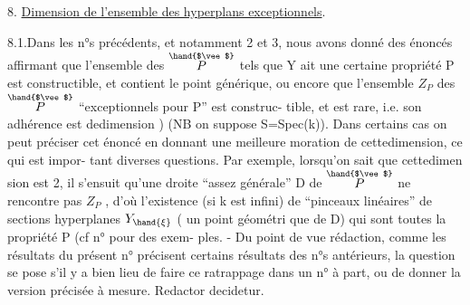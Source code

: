 
8. \uline{Dimension de l'ensemble des hyperplans exceptionnels}.

8.1.Dans les n°s précédents, et notamment 2 et 3, nous avons donné des
énoncés affirmant que l'ensemble des \hand{$\xi\in$} $\overset{\hand{$\vee$}}{P}$ tels que Y ait une certaine
propriété P est constructible, et contient le point générique\inserted{$\eta$},  ou
encore que l'ensemble $Z_P$ des \hand{$\xi\in$} $\overset{\hand{$\vee$}}{P}$ ``exceptionnels pour P'' est construc-%
tible, et est rare, i.e. son adhérence est dedimension \hand{$\geq$} ) 
(NB on suppose S=Spec(k)). Dans certains cas on peut préciser cet énoncé
en donnant une meilleure moration de cettedimension, ce qui est impor-%
tant  diverses questions. Par exemple, lorsqu'on sait que cettedimen
sion est \hand{$\geq$} 2, il s'ensuit qu'une droite ``assez générale'' D de $\overset{\hand{$\vee$}}{P}$
ne rencontre pas $Z_P$ , d'où l'existence (si k est infini) de ``pinceaux
linéaires'' de sections hyperplanes  $Y_{\hand{\xi}}$ (\hand{$\xi$} un point géométri
que de D) qui sont toutes la propriété P (cf n° \inserted{$-\ -\ -\ -$} pour des exem-%
ples. - Du point de vue rédaction, comme les résultats du présent n°
précisent certains résultats des n°s antérieurs, la question se pose s'il
y a bien lieu de faire ce ratrappage dans un n° à part, ou de donner la
version précisée à mesure. Redactor decidetur.


